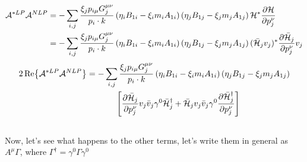 \documentclass{article}
\begin{document}
\begin{align*}
	\mathcal{A}^{*LP}\mathcal{A}^{NLP} &= -\sum_{i,j}\frac{\xi_j p_{i\mu}G_j^{\mu\nu}}{p_i\cdot k}\left(\eta_iB_{1i}-\xi_im_iA_{1i}\right) \left(\eta_j B_{1j}-\xi_jm_jA_{1j}\right)\mathcal{H}^*\pdv{\mathcal{H}}{p_{j}^\nu}\\&
	=-\sum_{i,j}\frac{\xi_j p_{i\mu}G_j^{\mu\nu}}{p_i\cdot k}\left(\eta_iB_{1i}-\xi_im_iA_{1i}\right) \left(\eta_j B_{1j}-\xi_jm_jA_{1j}\right)(\bar{\mathcal{H}}_jv_j)^*\pdv{\bar{\mathcal{H}}_j}{p_{j}^\nu}v_j
\end{align*}
\begin{align*}
	2\Re{\mathcal{A}^{*LP}\mathcal{A}^{NLP}} &=-\sum_{i,j}\frac{\xi_j p_{i\mu}G_j^{\mu\nu}}{p_i\cdot k}\left(\eta_iB_{1i}-\xi_im_iA_{1i}\right)\left(\eta_jB_{1j}-\xi_jm_jA_{1j}\right)\\&\phantom{=-\sum_{i,j}}\left[\pdv{\bar{\mathcal{H}}_j}{p_{j}^\nu}v_j\bar{v}_j\gamma^0\bar{\mathcal{H}}^\dag_j +\bar{\mathcal{H}}_jv_j\bar{v}_j\gamma^0\pdv{\bar{\mathcal{H}}^\dag_j}{p_{j}^\nu}\right]
\end{align*}
\\
Now, let's see what happens to the other terms, let's write them in general as $A^\mu\Gamma$, where $\Gamma^\dag= \gamma^0\Gamma\gamma^0$
\end{document}
